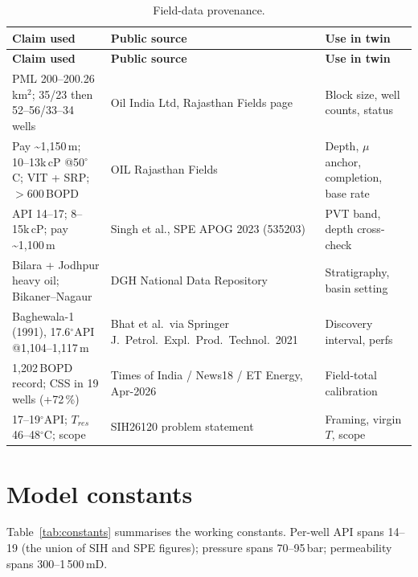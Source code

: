 \documentclass[12pt,a4paper]{report}
\begin{document}
\begin{longtable}{p{3.2cm}p{6.2cm}p{5.2cm}}
\caption{Field-data provenance.\label{tab:sources}} \\ \toprule
\textbf{Claim used} & \textbf{Public source} & \textbf{Use in twin} \\ \midrule
\endfirsthead
\toprule \textbf{Claim used} & \textbf{Public source} & \textbf{Use in twin} \\ \midrule
\endhead
PML 200--200.26\,km$^2$; 35/23 then 52--56/33--34 wells & Oil India Ltd,
Rajasthan Fields page & Block size, well counts, status \\[2pt]
Pay \textasciitilde1,150\,m; 10--13k\,cP @50$^\circ$C; VIT + SRP; $>$600\,BOPD &
OIL Rajasthan Fields & Depth, $\mu$ anchor, completion, base rate \\[2pt]
API 14--17; 8--15k\,cP; pay \textasciitilde1,100\,m &
Singh et al., SPE APOG 2023 (535203) & PVT band, depth cross-check \\[2pt]
Bilara + Jodhpur heavy oil; Bikaner--Nagaur &
DGH National Data Repository & Stratigraphy, basin setting \\[2pt]
Baghewala-1 (1991), 17.6$^\circ$API @1,104--1,117\,m &
Bhat et al.\ via Springer J.\ Petrol.\ Expl.\ Prod.\ Technol.\ 2021 &
Discovery interval, perfs \\[2pt]
1,202\,BOPD record; CSS in 19 wells (+72\,\%) &
Times of India / News18 / ET Energy, Apr-2026 & Field-total calibration \\[2pt]
17--19$^\circ$API; $T_{res}$ 46--48$^\circ$C; scope &
SIH26120 problem statement & Framing, virgin $T$, scope \\
\bottomrule
\end{longtable}

\section{Model constants}
Table~\ref{tab:constants} summarises the working constants. Per-well API spans
14--19 (the union of SIH and SPE figures); pressure spans 70--95\,bar;
permeability spans 300--1\,500\,mD.
\end{document}
